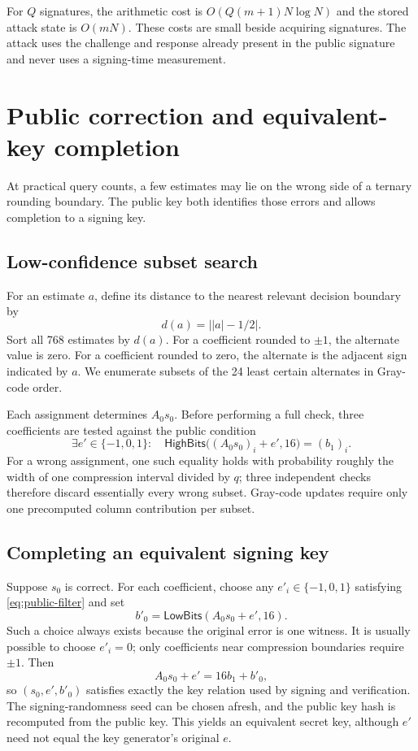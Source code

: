 \documentclass[11pt,a4paper]{article}
\newcommand{\HighBits}{\mathsf{HighBits}}
\newcommand{\LowBits}{\mathsf{LowBits}}
\begin{document}
For $Q$ signatures, the arithmetic cost is
$O(Q(m+1)N\log N)$ and the stored attack state is $O(mN)$.  These costs are
small beside acquiring signatures.  The attack uses the challenge and response
already present in the public signature and never uses a signing-time
measurement.

\section{Public correction and equivalent-key completion}

At practical query counts, a few estimates may lie on the wrong side of a
ternary rounding boundary.  The public key both identifies those errors and
allows completion to a signing key.

\subsection{Low-confidence subset search}

For an estimate $a$, define its distance to the nearest relevant decision
boundary by
\[
                         d(a)=\bigl||a|-1/2\bigr|.
\]
Sort all 768 estimates by $d(a)$.  For a coefficient rounded to $\pm1$, the
alternate value is zero.  For a coefficient rounded to zero, the alternate is
the adjacent sign indicated by $a$.  We enumerate subsets of the 24 least
certain alternates in Gray-code order.

Each assignment determines $A_0s_0$.  Before performing a full check, three
coefficients are tested against the public condition
\begin{equation}
 \exists e'\in\{-1,0,1\}:\quad
 \HighBits\bigl((A_0s_0)_i+e',16\bigr)=(b_1)_i.
 \label{eq:public-filter}
\end{equation}
For a wrong assignment, one such equality holds with probability roughly the
width of one compression interval divided by $q$; three independent checks
therefore discard essentially every wrong subset.  Gray-code updates require
only one precomputed column contribution per subset.

\subsection{Completing an equivalent signing key}

Suppose $s_0$ is correct.  For each coefficient, choose any
$e'_i\in\{-1,0,1\}$ satisfying \eqref{eq:public-filter} and set
\begin{equation}
 b'_0=\LowBits(A_0s_0+e',16).
 \label{eq:completion}
\end{equation}
Such a choice always exists because the original error is one witness.  It is
usually possible to choose $e'_i=0$; only coefficients near compression
boundaries require $\pm1$.  Then
\[
       A_0s_0+e'=16b_1+b'_0,
\]
so $(s_0,e',b'_0)$ satisfies exactly the key relation used by signing and
verification.  The signing-randomness seed can be chosen afresh, and the public
key hash is recomputed from the public key.  This yields an equivalent secret
key, although $e'$ need not equal the key generator's original $e$.
\end{document}
